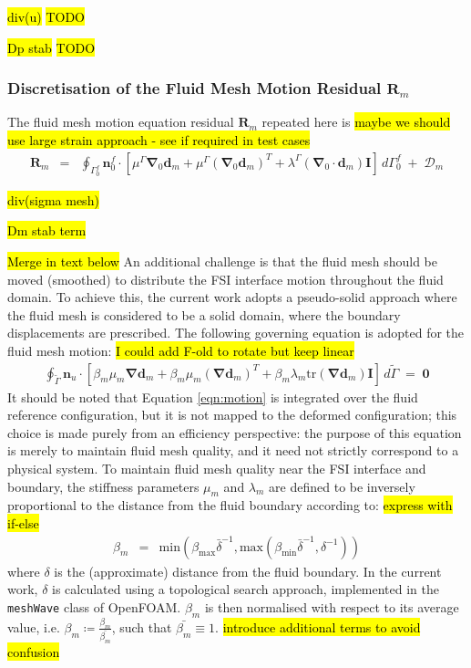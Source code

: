 \documentclass[sn-mathphys,Numbered]{sn-jnl}%
\newcommand{\bb}{\boldsymbol}
\begin{document}
\hl{div(u)}
\hl{TODO}

\hl{Dp stab}
\hl{TODO}

\subsubsection[Discretisation of the Fluid Mesh Motion Residual]{Discretisation of the Fluid Mesh Motion Residual $\bb{R}_m$}
The fluid mesh motion equation residual $\bb{R}_m$ repeated here is \hl{maybe we should use large strain approach - see if required in test cases}
\begin{eqnarray}
    \bb{R}_m
    &=&
    \oint_{\Gamma_0^f} \bb{n}_0^f \cdot
    \left[
    \mu^\Gamma \bb{\nabla}_0 \bb{d}_m + \mu^\Gamma \left(\bb{\nabla}_0 \bb{d}_m \right)^T
    + \lambda^\Gamma (\bb{\nabla}_0 \cdot \bb{d}_m) \textbf{I}
    \right]
    \, d\Gamma_0^f
    \;+\; \bb{\mathcal{D}}_m
\end{eqnarray}

\hl{div(sigma mesh)}

\hl{Dm stab term}


\hl{Merge in text below}
An additional challenge is that the fluid mesh should be moved (smoothed) to distribute the FSI interface motion throughout the fluid domain.
To achieve this, the current work adopts a pseudo-solid approach where the fluid mesh is considered to be a solid domain, where the boundary displacements are prescribed.
The following governing equation is adopted for the fluid mesh motion: \hl{I could add F-old to rotate but keep linear}
\begin{eqnarray} \label{eqn:motion}
    \oint_{\tilde{\Gamma}}
    \bb{n}_u \cdot \left[ \beta_m \mu_m \bb{\nabla}\bb{d}_m
    + \beta_m \mu_m (\bb{\nabla}\bb{d}_m)^T
    + \beta_m \lambda_m \text{tr}(\bb{\nabla} \bb{d}_m)\textbf{I} \right] 
    \, d\tilde{\Gamma}
    \;=\; \bb{0}
\end{eqnarray}
It should be noted that Equation \ref{eqn:motion} is integrated over the fluid reference configuration, but it is not mapped to the deformed configuration; this choice is made purely from an efficiency perspective: the purpose of this equation is merely to maintain fluid mesh quality, and it need not strictly correspond to a physical system.
To maintain fluid mesh quality near the FSI interface and boundary, the stiffness parameters $\mu_m$ and $\lambda_m$ are defined to be inversely proportional to the distance from the fluid boundary according to:
\hl{express with if-else}
\begin{eqnarray}
	\beta_m &=& \text{min}(\beta_\text{max} \bar{\delta}^{-1}, \text{max}(\beta_\text{min} \bar{\delta}^{-1}, \delta^{-1}))
\end{eqnarray}
where $\delta$ is the (approximate) distance from the fluid boundary.
In the current work, $\delta$ is calculated using a topological search approach, implemented in the \texttt{meshWave} class of OpenFOAM.
$\beta_m$ is then normalised with respect to its average value, i.e. $\beta_m \coloneqq \frac{\beta_m}{\bar{\beta_m}}$, such that $\bar{\beta_m} \equiv 1$. \hl{introduce additional terms to avoid confusion}
\end{document}
